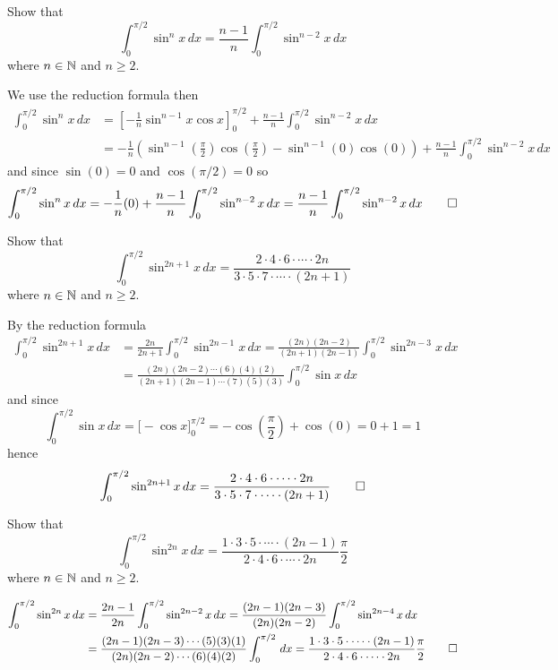 \begin{problem}
    Show that
    \[\int_0^{\pi/2}\sin^n x\,dx=\frac{n-1}{n}\int_0^{\pi/2}\sin^{n-2}x\,dx\]
    where \(n\in\mathbb{N}\) and \(n\geq 2\).
\end{problem}
\begin{solution}
    We use the reduction formula then
    \begin{align*}
        \int_0^{\pi/2}\sin^n x\,dx
        &= \left[-\frac{1}{n}\sin^{n-1} x\cos x\right]_0^{\pi/2}
        +\frac{n-1}{n}\int_0^{\pi/2}\sin^{n-2} x\,dx \\
        &= -\frac{1}{n}\left(\sin^{n-1}\left(\frac{\pi}{2}\right)
        \cos\left(\frac{\pi}{2}\right)-\sin^{n-1}(0)\cos(0)\right)
        +\frac{n-1}{n}\int_0^{\pi/2}\sin^{n-2} x\,dx
    \end{align*}
    and since \(\sin(0)=0\) and \(\cos(\pi/2)=0\) so
    \[\int_0^{\pi/2}\sin^n x\,dx=-\frac{1}{n}(0)
    +\frac{n-1}{n}\int_0^{\pi/2}\sin^{n-2} x\,dx
    =\frac{n-1}{n}\int_0^{\pi/2}\sin^{n-2} x\,dx\qedhere\]
\end{solution}
\begin{problem}
    Show that
    \[\int_0^{\pi/2}\sin^{2n+1} x\,dx
    =\frac{2\cdot4\cdot6\cdot\cdots\cdot2n}
    {3\cdot5\cdot7\cdot\cdots\cdot(2n+1)}\]
    where \(n\in\mathbb{N}\) and \(n\geq 2\).
\end{problem}
\begin{solution}
    By the reduction formula
    \begin{align*}
        \int_0^{\pi/2}\sin^{2n+1} x\,dx
        &= \frac{2n}{2n+1}\int_{0}^{\pi/2}\sin^{2n-1} x\,dx
        =\frac{(2n)(2n-2)}{(2n+1)(2n-1)}\int_{0}^{\pi/2}\sin^{2n-3} x\,dx \\
        &= \frac{(2n)(2n-2)\cdots(6)(4)(2)}{(2n+1)(2n-1)\cdots(7)(5)(3)}
        \int_{0}^{\pi/2}\sin x\,dx
    \end{align*}
    and since
    \[\int_{0}^{\pi/2}\sin x\,dx=\Big[-\cos x\Big]_0^{\pi/2}
    =-\cos\left(\frac{\pi}{2}\right)+\cos(0)=0+1=1\]
    hence
    \[\int_0^{\pi/2}\sin^{2n+1} x\,dx
    =\frac{2\cdot4\cdot6\cdot\cdots\cdot2n}
    {3\cdot5\cdot7\cdot\cdots\cdot(2n+1)}\qedhere\]
\end{solution}
\begin{problem}
    Show that
    \[\int_0^{\pi/2}\sin^{2n} x\,dx
    =\frac{1\cdot3\cdot5\cdot\cdots\cdot(2n-1)}
    {2\cdot4\cdot6\cdot\cdots\cdot2n}\frac{\pi}{2}\]
    where \(n\in\mathbb{N}\) and \(n\geq 2\).
\end{problem}
\begin{solution}
    \begin{align*}
        \int_0^{\pi/2}\sin^{2n} x\,dx
        &= \frac{2n-1}{2n}\int_0^{\pi/2}\sin^{2n-2} x\,dx
        =\frac{(2n-1)(2n-3)}{(2n)(2n-2)}\int_0^{\pi/2}\sin^{2n-4} x\,dx \\
        &= \frac{(2n-1)(2n-3)\cdots(5)(3)(1)}{(2n)(2n-2)\cdots(6)(4)(2)}
        \int_0^{\pi/2}\,dx=\frac{1\cdot3\cdot5\cdot\cdots\cdot(2n-1)}
        {2\cdot4\cdot6\cdot\cdots\cdot2n}\frac{\pi}{2} \qedhere
    \end{align*}
\end{solution}
